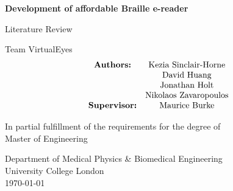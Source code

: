 \begin{titlepage}
    \begin{center}
        \vspace*{1cm}
            
        \huge
        \textbf{Development of affordable Braille e-reader}
            
        \vspace{0.5cm}
        \Large
        Literature Review

        \vspace{1.5cm}
        Team VirtualEyes
        \begin{align*}
            \begin{matrix}
                \text{\textbf{Authors:}} & \text{Kezia Sinclair-Horne} \\     
                                         & \text{David Huang} \\
                                         & \text{Jonathan Holt} \\
                                         & \text{Nikolaos Zavaropoulos} \\
                \textbf{Supervisor:} & \text{Maurice Burke} \\
            \end{matrix} \end{align*}

            
        \vfill
            
        In partial fulfillment of the requirements for the degree of \\
        Master of Engineering
            
        \vspace{0.8cm}
            
        \large
        Department of Medical Physics \& Biomedical Engineering\\
        University College London\\
        \today \\
            
    \end{center}
\end{titlepage}